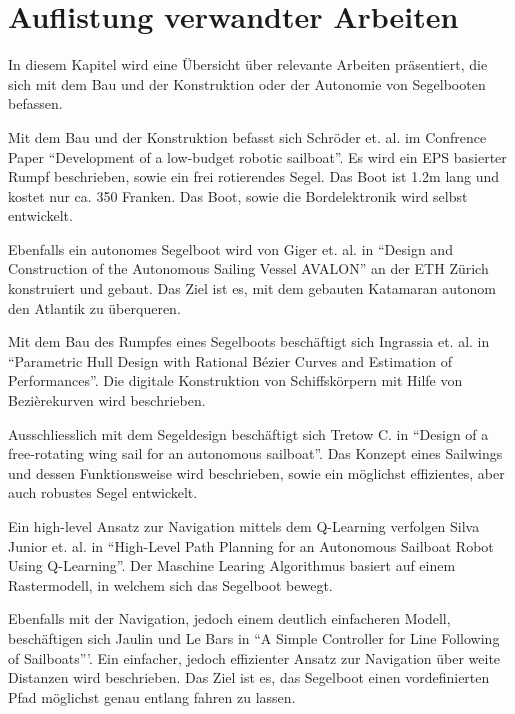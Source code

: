 

\chapter{Auflistung verwandter Arbeiten}
\label{chap:literaturübersicht}

In diesem Kapitel wird eine Übersicht über relevante Arbeiten präsentiert, die sich mit dem Bau und der Konstruktion oder der Autonomie von Segelbooten befassen.

Mit dem Bau und der Konstruktion befasst sich Schröder et. al. im Confrence Paper \enquote{Development of a low-budget robotic sailboat}. Es wird ein EPS basierter Rumpf beschrieben, sowie ein frei rotierendes Segel. Das Boot ist 1.2m lang und kostet nur ca. 350 Franken. Das Boot, sowie die Bordelektronik wird selbst entwickelt. \cite{10.1007/978-3-319-02276-5_2}
 
Ebenfalls ein autonomes Segelboot wird von Giger et. al. in \enquote{Design and Construction of the Autonomous Sailing Vessel AVALON} an der ETH Zürich konstruiert und gebaut. Das Ziel ist es, mit dem gebauten Katamaran autonom den Atlantik zu überqueren. \cite{giger_design_2009}

Mit dem Bau des Rumpfes eines Segelboots beschäftigt sich Ingrassia et. al. in \enquote{Parametric Hull Design with Rational Bézier Curves and Estimation of Performances}. Die digitale Konstruktion von Schiffskörpern mit Hilfe von Bezièrekurven wird beschrieben. \cite{ingrassia_parametric_2021}

Ausschliesslich mit dem Segeldesign beschäftigt sich Tretow C. in \enquote{Design of a free-rotating wing sail for an autonomous sailboat}. Das Konzept eines Sailwings und dessen Funktionsweise wird beschrieben, sowie ein möglichst effizientes, aber auch robustes Segel entwickelt. \cite{Tretow2017DesignOA}

Ein high-level Ansatz zur Navigation mittels dem Q-Learning verfolgen Silva Junior et. al. in \enquote{High-Level Path Planning for an Autonomous Sailboat Robot Using Q-Learning}. Der Maschine Learing Algorithmus basiert auf einem Rastermodell, in welchem sich das Segelboot bewegt. \cite{silva_junior_high-level_2020}

Ebenfalls mit der Navigation, jedoch einem deutlich einfacheren Modell, beschäftigen sich Jaulin und Le Bars in \enquote{{}A{} Simple Controller for Line Following of Sailboats}'. Ein einfacher, jedoch effizienter Ansatz zur Navigation über weite Distanzen wird beschrieben. Das Ziel ist es, das Segelboot einen vordefinierten Pfad möglichst genau entlang fahren zu lassen. \cite{sauze_simple_2013}

